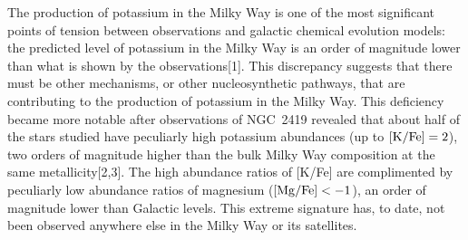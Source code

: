 \documentclass[12pt]{report}
\begin{document}
The production of potassium in the Milky Way is one of the most significant points of tension between observations and galactic chemical evolution models: the predicted level of potassium in the Milky Way is an order of magnitude lower than what is shown by the observations[1]. This discrepancy suggests that there must be other mechanisms, or other nucleosynthetic pathways, that are contributing to the production of potassium in the Milky Way. This deficiency became more notable after observations of NGC~2419 revealed that about half of the stars studied have peculiarly high potassium abundances (up to $[{\rm K/Fe}] = 2$), two orders of magnitude higher than the bulk Milky Way composition at the same metallicity[2,3]. The high abundance ratios of [K/Fe] are complimented by peculiarly low abundance ratios of magnesium ($[{\rm Mg/Fe}] < -1$), an order of magnitude lower than Galactic levels. This extreme signature has, to date, not been observed anywhere else in the Milky Way or its satellites.%









\end{document}
